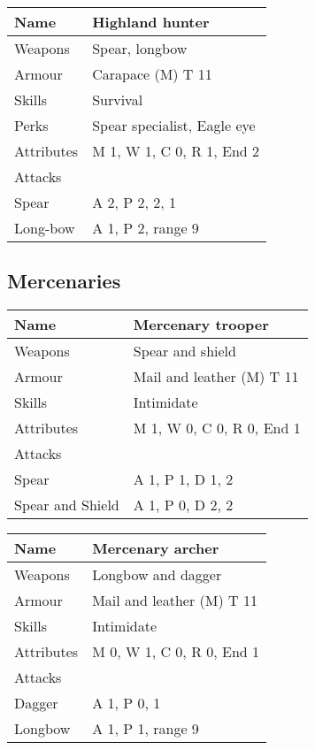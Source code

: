 \documentclass[a4paper,11pt,oneside]{book}
\newcommand{\textlf}[1]{\textbf{\titlecap{#1}}}
\begin{document}
\begin{tabular}{|l|l|}
	\hline
	Name & Highland hunter\\
	\hline
	Weapons & Spear, longbow\\
	Armour & Carapace (M) T 11\\
	Skills & Survival\\
	Perks & Spear specialist, Eagle eye \\
	Attributes & M 1, W 1, C 0, R 1, End 2\\ 
	\hline
	Attacks & \\
	\hline
	Spear & A 2, P 2, \textlf{Rending} 2, \textlf{Defence} 1 \\
	Long-bow & A 1, P 2, range 9\\
	\hline
\end{tabular}

\subsection{Mercenaries}

\begin{tabular}{|l|l|}
	\hline
	Name & Mercenary trooper\\
	\hline
	Weapons & Spear and shield\\
	Armour & Mail and leather (M) T 11\\
	Skills & Intimidate\\
	Attributes & M 1, W 0, C 0, R 0, End 1\\
	\hline
	Attacks & \\
	\hline
 	Spear & A 1, P 1, D 1, \textlf{Rending} 2\\
	Spear and Shield & A 1, P 0, D 2, \textlf{Rending} 2\\
	\hline
\end{tabular}

\begin{tabular}{|l|l|}
	\hline
	Name & Mercenary archer\\
	\hline
	Weapons & Longbow and dagger\\
	Armour & Mail and leather (M) T 11\\
	Skills & Intimidate\\
	Attributes & M 0, W 1, C 0, R 0, End 1\\
	\hline
	Attacks & \\
	\hline
	Dagger & A 1, P 0, \textlf{Rending} 1\\
	Longbow & A 1, P 1, range 9\\
	\hline
\end{tabular}
\end{document}
